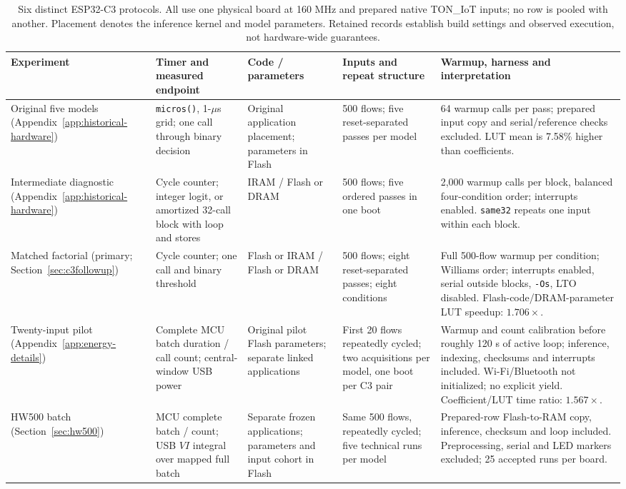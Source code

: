 \begin{table}[t]
\caption{Six distinct ESP32-C3 protocols. All use one physical board at 160 MHz and prepared native TON\_IoT inputs; no row is pooled with another. Placement denotes the inference kernel and model parameters. Retained records establish build settings and observed execution, not hardware-wide guarantees.}
\label{tab:protocol-map}
\centering\scriptsize\setlength{\tabcolsep}{3pt}
\begin{tabular}{p{2.0cm}p{3.2cm}p{2.5cm}p{3.5cm}p{5.3cm}}
\toprule
Experiment & Timer and measured endpoint & Code / parameters & Inputs and repeat structure & Warmup, harness and interpretation\\
\midrule
Original five models (Appendix~\ref{app:historical-hardware}) & \texttt{micros()}, 1-$\mu$s grid; one call through binary decision & Original application placement; parameters in Flash & 500 flows; five reset-separated passes per model & 64 warmup calls per pass; prepared input copy and serial/reference checks excluded. LUT mean is 7.58\% higher than coefficients.\\
Intermediate diagnostic (Appendix~\ref{app:historical-hardware}) & Cycle counter; integer logit, or amortized 32-call block with loop and stores & IRAM / Flash or DRAM & 500 flows; five ordered passes in one boot & 2,000 warmup calls per block, balanced four-condition order; interrupts enabled. \texttt{same32} repeats one input within each block.\\
Matched factorial (primary; Section~\ref{sec:c3followup}) & Cycle counter; one call and binary threshold & Flash or IRAM / Flash or DRAM & 500 flows; eight reset-separated passes; eight conditions & Full 500-flow warmup per condition; Williams order; interrupts enabled, serial outside blocks, \texttt{-Os}, LTO disabled. Flash-code/DRAM-parameter LUT speedup: $1.706\times$.\\
Twenty-input pilot (Appendix~\ref{app:energy-details}) & Complete MCU batch duration / call count; central-window USB power & Original pilot Flash parameters; separate linked applications & First 20 flows repeatedly cycled; two acquisitions per model, one boot per C3 pair & Warmup and count calibration before roughly 120 s of active loop; inference, indexing, checksums and interrupts included. Wi-Fi/Bluetooth not initialized; no explicit yield. Coefficient/LUT time ratio: $1.567\times$.\\
HW500 batch (Section~\ref{sec:hw500}) & MCU complete batch / count; USB $VI$ integral over mapped full batch & Separate frozen applications; parameters and input cohort in Flash & Same 500 flows, repeatedly cycled; five technical runs per model & Prepared-row Flash-to-RAM copy, inference, checksum and loop included. Preprocessing, serial and LED markers excluded; 25 accepted runs per board.\\

\end{tabular}
\end{table}

